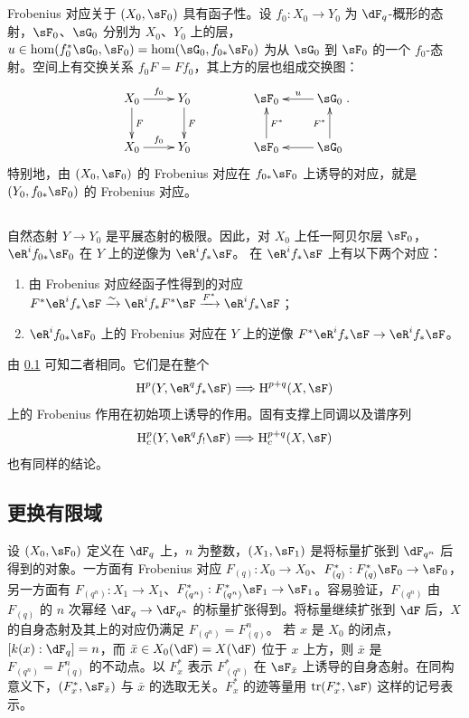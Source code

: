 \subsection{}\label{II:1-3}
Frobenius 对应关于 $(X_0,\sF_0)$ 具有函子性。设 $f_0:X_0\to Y_0$ 为 $\dF_q$-概形的态射，$\sF_0$、$\sG_0$ 分别为 $X_0$、$Y_0$ 上的层，$u\in\hom(f_0^*\sG_0,\sF_0)=\hom(\sG_0,f_{0*}\sF_0)$ 为从 $\sG_0$ 到 $\sF_0$ 的一个 $f_0$-态射。空间上有交换关系 $f_0F=Ff_0$，其上方的层也组成交换图：
\[\xymatrix{X_0\ar[r]^-{f_0}\ar[d]^-F&Y_0\ar[d]^-F\\X_0\ar[r]^-{f_0}&Y_0}
\qquad\qquad
\xymatrix{\sF_0&\ar[l]_-u\sG_0\\\sF_0\ar[u]_-{F^*}&\ar[l]\sG_0\ar[u]^-{F^*}}.\]
特别地，由 $(X_0,\sF_0)$ 的 Frobenius 对应在 $f_{0*}\sF_0$ 上诱导的对应，就是 $(Y_0,f_{0*}\sF_0)$ 的 Frobenius 对应。

\subsection{}\label{II:1-4}
自然态射 $Y\to Y_0$ 是平展态射的极限。因此，对 $X_0$ 上任一阿贝尔层 $\sF_0$，$\eR^if_{0*}\sF_0$ 在 $Y$ 上的逆像为 $\eR^if_*\sF$。
在 $\eR^if_*\sF$ 上有以下两个对应：
\begin{enumerate}[\indent a)]
\item 由 Frobenius 对应经函子性得到的对应
$F^*\eR^if_*\sF\iso\eR^if_*F^*\sF\xrightarrow{F^*}\eR^if_*\sF$；
\item $\eR^if_{0*}\sF_0$ 上的 Frobenius 对应在 $Y$ 上的逆像 $F^*\eR^if_*\sF\to\eR^if_*\sF$。
\end{enumerate}
由 \ref{II:1-3} 可知二者相同。它们是在整个
\[\h^p(Y,\eR^qf_*\sF)\Longrightarrow\h^{p+q}(X,\sF)\]
上的 Frobenius 作用在初始项上诱导的作用。固有支撑上同调以及谱序列
\[\h_c^p(Y,\eR^qf_!\sF)\Longrightarrow\h_c^{p+q}(X,\sF)\]
也有同样的结论。

\subsection{更换有限域}\label{II:1-5}
设 $(X_0,\sF_0)$ 定义在 $\dF_q$ 上，$n$ 为整数，$(X_1,\sF_1)$ 是将标量扩张到 $\dF_{q^n}$ 后得到的对象。一方面有 Frobenius 对应 $F_{(q)}:X_0\to X_0$、$F_{(q)}^*:F_{(q)}^*\sF_0\to\sF_0$，另一方面有 $F_{(q^n)}:X_1\to X_1$、$F_{(q^n)}^*:F_{(q^n)}^*\sF_1\to\sF_1$。容易验证，$F_{(q^n)}$ 由 $F_{(q)}$ 的 $n$ 次幂经 $\dF_q\to\dF_{q^n}$ 的标量扩张得到。将标量继续扩张到 $\dF$ 后，$X$ 的自身态射及其上的对应仍满足 $F_{(q^n)}=F_{(q)}^n$。
若 $x$ 是 $X_0$ 的闭点，$[k(x):\dF_q]=n$，而 $\bar x\in X_0(\dF)=X(\dF)$ 位于 $x$ 上方，则 $\bar x$ 是 $F_{(q^n)}=F_{(q)}^n$ 的不动点。以 $F_x^*$ 表示 $F_{(q^n)}^*$ 在 $\sF_{\bar x}$ 上诱导的自身态射。在同构意义下，$(F_x^*,\sF_{\bar x})$ 与 $\bar x$ 的选取无关。$F_x^*$ 的迹等量用 $\tr(F_x^*,\sF)$ 这样的记号表示。

